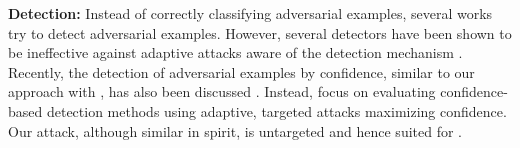 \textbf{Detection:}
%
Instead of correctly classifying adversarial examples, several works \cite{GongARXIV2017,GrosseARXIV2017,FeinmanARXIV2017,LiaoCVPR2018,MaICLR2018,AmsalegWIFS2017,MetzenICLR2017,BhagojiARXIV2017,HendrycksICLR2017,LiICCV2017,LeeNIPS2018} try to detect adversarial examples. However, several detectors have been shown to be ineffective against adaptive attacks aware of the detection mechanism \cite{CarliniAISec2017}. Recently, the detection of adversarial examples by confidence, similar to our approach with \ConfTrain, has also been discussed \cite{PangNIPS2018}. Instead, \citet{GoodfellowOPENREVIEW2019} focus on evaluating confidence-based detection methods using adaptive, targeted attacks maximizing confidence. Our attack, although similar in spirit, is untargeted and hence suited for \ConfTrain.
